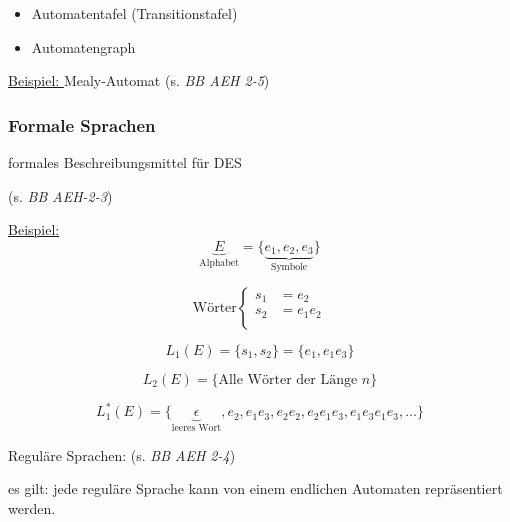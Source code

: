\begin{itemize}
	\item Automatentafel (Transitionstafel)
	\item Automatengraph 
\end{itemize}

\underline{Beispiel: } Mealy-Automat (s. \textit{BB AEH 2-5})

\subsubsection{Formale Sprachen}
formales Beschreibungsmittel für DES

(s. \textit{BB AEH-2-3})

\underline{Beispiel:}
\begin{equation}
	\underbrace{E}_\text{Alphabet} = \{\underbrace{e_1, e_2, e_3}_\text{Symbole}\}
\end{equation}

\begin{equation}
\text{Wörter}\left\{
\begin{aligned}
s_1 &= e_2 \\
s_2 &= e_1 e_2 \\
\end{aligned}
\right.
\end{equation}

\begin{equation}
	L_1(E) = \{s_1, s_2\} = \{e_1, e_1 e_3\} 
\end{equation}

\begin{equation}
	L_2(E) = \{ \text{Alle Wörter der Länge } n \}
\end{equation}

\begin{equation}
	L_1^{\ast}(E) = \{ \underbrace{\epsilon}_\text{leeres Wort}, e_2, e_1 e_3, e_2 e_2, e_2 e_1 e_3, e_1 e_3 e_1 e_3, \ldots \}
\end{equation}



Reguläre Sprachen: (s. \textit{BB AEH 2-4})

es gilt: jede reguläre Sprache kann von einem endlichen Automaten repräsentiert werden.

